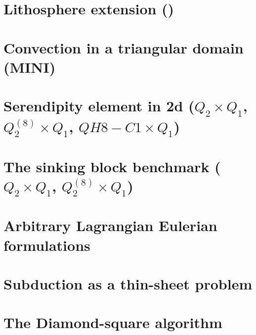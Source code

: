 \documentclass[a4paper,11pt]{report}
\begin{document}
\chapter{Lithosphere extension (\QtwoQone)\label{f50}} %

\chapter{Convection in a triangular domain (MINI)\label{f51}} %

\chapter{Serendipity element in 2d ($Q_2\times Q_1$, $Q_2^{(8)}\times Q_1$, $QH8-C1\times Q_1$) \label{f52}} %

\chapter{The sinking block benchmark ($Q_2\times Q_1$, $Q_2^{(8)}\times Q_1$) \label{f53}} %

\chapter{Arbitrary Lagrangian Eulerian formulations \label{f54}} %

\chapter{Subduction as a thin-sheet problem  \label{f55}} %

\chapter{The Diamond-square algorithm \label{f56}} %
\end{document}
